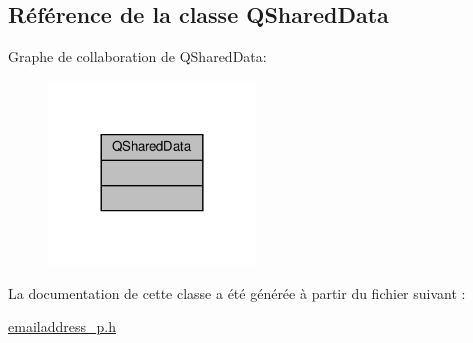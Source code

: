\hypertarget{class_q_shared_data}{}\subsection{Référence de la classe Q\+Shared\+Data}
\label{class_q_shared_data}


Graphe de collaboration de Q\+Shared\+Data\+:\nopagebreak
\begin{figure}[H]
\begin{center}
\leavevmode
\includegraphics[width=156pt]{class_q_shared_data__coll__graph}
\end{center}
\end{figure}


La documentation de cette classe a été générée à partir du fichier suivant \+:\begin{DoxyCompactItemize}
\item 
\hyperlink{emailaddress__p_8h}{emailaddress\+\_\+p.\+h}\end{DoxyCompactItemize}

